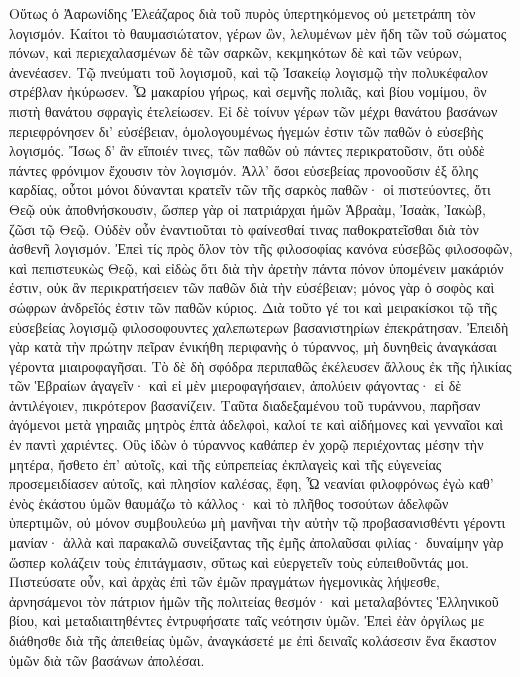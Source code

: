 Οὕτως ὁ Ἀαρωνίδης Ἐλεάζαρος διὰ τοῦ πυρὸς ὑπερτηκόμενος οὐ μετετράπη τὸν λογισμόν. 
Καίτοι τὸ θαυμασιώτατον, γέρων ὢν, λελυμένων μὲν ἤδη τῶν τοῦ σώματος πόνων, καὶ περιεχαλασμένων δὲ τῶν σαρκῶν, κεκμηκότων δὲ καὶ τῶν νεύρων, ἀνενέασεν. 
Τῷ πνεύματι τοῦ λογισμοῦ, καὶ τῷ Ἰσακείῳ λογισμῷ τὴν πολυκέφαλον στρέβλαν ἠκύρωσεν. 
Ὦ μακαρίου γήρως, καὶ σεμνῆς πολιᾶς, καὶ βίου νομίμου, ὃν πιστὴ θανάτου σφραγὶς ἐτελείωσεν. 
Εἰ δὲ τοίνυν γέρων τῶν μέχρι θανάτου βασάνων περιεφρόνησεν δι' εὐσέβειαν, ὁμολογουμένως ἡγεμών ἐστιν τῶν παθῶν ὁ εὐσεβὴς λογισμός. 
Ἴσως δ' ἂν εἴποιέν τινες, τῶν παθῶν οὐ πάντες περικρατοῦσιν, ὅτι οὐδὲ πάντες φρόνιμον ἔχουσιν τὸν λογισμόν. 
Ἀλλ' ὅσοι εὑσεβείας προνοοῦσιν ἐξ ὅλης καρδίας, οὗτοι μόνοι δύνανται κρατεῖν τῶν τῆς σαρκὸς παθῶν· 
οἱ πιστεύοντες, ὅτι Θεῷ οὐκ ἀποθνήσκουσιν, ὥσπερ γὰρ οἱ πατριάρχαι ἡμῶν Ἁβραὰμ, Ἰσαὰκ, Ἰακὼβ, ζῶσι τῷ Θεῷ. 
Οὐδὲν οὖν ἐναντιοῦται τὸ φαίνεσθαί τινας παθοκρατεῖσθαι διὰ τὸν ἀσθενῆ λογισμόν. 
Ἐπεὶ τίς πρὸς ὅλον τὸν τῆς φιλοσοφίας κανόνα εὐσεβῶς φιλοσοφῶν, καὶ πεπιστευκὼς Θεῷ, 
καὶ εἰδὼς ὅτι διὰ τὴν ἀρετὴν πάντα πόνον ὑπομένειν μακάριόν ἐστιν, οὐκ ἂν περικρατήσειεν τῶν παθῶν διὰ τὴν εὐσέβειαν; 
μόνος γὰρ ὁ σοφὸς καὶ σώφρων ἀνδρεῖός ἐστιν τῶν παθῶν κύριος. 
Διὰ τοῦτο γέ τοι καὶ μειρακίσκοι τῷ τῆς εὐσεβείας λογισμῷ φιλοσοφουντες χαλεπωτερων βασανιστηρίων ἐπεκράτησαν. 
Ἐπειδὴ γὰρ κατὰ τὴν πρώτην πεῖραν ἐνικήθη περιφανὴς ὁ τύραννος, μὴ δυνηθεὶς ἀναγκάσαι γέροντα μιαιροφαγῆσαι. 
Τὸ δὲ δὴ σφόδρα περιπαθῶς ἐκέλευσεν ἄλλους ἐκ τῆς ἠλικίας τῶν Ἑβραίων ἀγαγεῖν· καὶ εἰ μὲν μιεροφαγήσαιεν, ἀπολύειν φάγοντας· εἰ δὲ ἀντιλέγοιεν, πικρότερον βασανίζειν. 
Ταῦτα διαδεξαμένου τοῦ τυράννου, παρῆσαν ἀγόμενοι μετὰ γηραιᾶς μητρὸς ἑπτὰ ἀδελφοὶ, καλοί τε καὶ αἰδήμονες καὶ γενναῖοι καὶ ἐν παντὶ χαριέντες. 
Οὓς ἰδὼν ὁ τύραννος καθάπερ ἐν χορῷ περιέχοντας μέσην τὴν μητέρα, ἤσθετο ἐπ' αὐτοῖς, καὶ τῆς εὐπρεπείας ἐκπλαγεὶς καὶ τῆς εὐγενείας προσεμειδίασεν αὐτοῖς, καὶ πλησίον καλέσας, ἔφη, 
Ὦ νεανίαι φιλοφρόνως ἐγὼ καθ' ἐνὸς ἑκάστου ὑμῶν θαυμάζω τὸ κάλλος· καὶ τὸ πλῆθος τοσούτων ἀδελφῶν ὑπερτιμῶν, οὐ μόνον συμβουλεύω μὴ μανῆναι τὴν αὐτὴν τῷ προβασανισθέντι γέροντι μανίαν· 
ἀλλὰ καὶ παρακαλῶ συνείξαντας τῆς ἐμῆς ἀπολαῦσαι φιλίας· δυναίμην γὰρ ὥσπερ κολάζειν τοὺς ἐπιτάγμασιν, σὕτως καὶ εὐεργετεῖν τοὺς εὐπειθοῦντάς μοι. 
Πιστεύσατε οὖν, καὶ ἀρχὰς ἐπὶ τῶν ἐμῶν πραγμάτων ἡγεμονικὰς λήψεσθε, ἀρνησάμενοι τὸν πάτριον ἡμῶν τῆς πολιτείας θεσμόν· 
καὶ μεταλαβόντες Ἑλληνικοῦ βίου, καὶ μεταδιαιτηθέντες ἐντρυφήσατε ταῖς νεότησιν ὑμῶν. 
Ἐπεὶ ἐὰν ὀργίλως με διάθησθε διὰ τῆς ἀπειθείας ὑμῶν, ἀναγκάσετέ με ἐπὶ δειναῖς κολάσεσιν ἕνα ἕκαστον ὑμῶν διὰ τῶν βασάνων ἀπολέσαι. 
